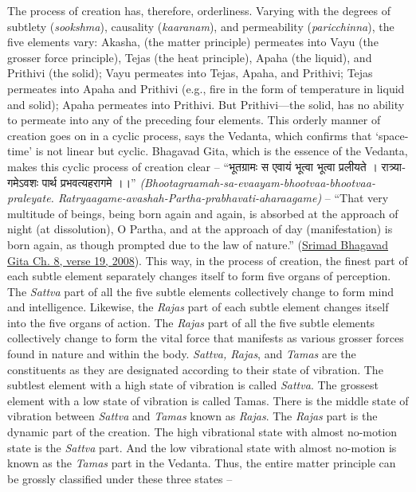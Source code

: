 \documentclass[twoside, 13pt]{article}
\begin{document}
{{The process of creation has, therefore, orderliness. Varying with the degrees of subtlety (\textit{sookshma}), causality (\textit{kaaranam}), and permeability (\textit{paricchinna}), the five elements vary: Akasha, (the matter principle) permeates into Vayu (the grosser force principle), Tejas (the heat principle), Apaha (the liquid), and Prithivi (the solid); Vayu permeates into Tejas, Apaha, and Prithivi; Tejas permeates into Apaha and Prithivi (e.g., fire in the form of temperature in liquid and solid); Apaha permeates into Prithivi. But Prithivi—the solid, has no ability to permeate into any of the preceding four elements. This orderly manner of creation goes on in a cyclic process, says the Vedanta, which confirms that ‘space-time’ is not linear but cyclic. Bhagavad Gita, which is the essence of the Vedanta, makes this cyclic process of creation clear – \foreignlanguage{hindi}{{\fontsize{9}{11}\selectfont “भूतग्रामः स एवायं भूत्वा भूत्वा प्रलीयते । रात्र्यागमेऽवशः पार्थ प्रभवत्यहरागमे ।।”}} \textit{(Bhootagraamah-sa-evaayam-bhootvaa-bhootvaa-praleyate. Ratryaagame-avashah-Partha-prabhavati-aharaagame)} – “That very multitude of beings, being born again and again, is absorbed at the approach of night (at dissolution), O Partha, and at the approach of day (manifestation) is born again, as though prompted due to the law of nature.” (\underline{Srimad Bhagavad Gita Ch. 8, verse 19, 2008}). This way, in the process of creation, the finest part of each subtle element separately changes itself to form five organs of perception. The \textit{Sattva} part of all the five subtle elements collectively change to form mind and intelligence. Likewise, the \textit{Rajas} part of each subtle element changes itself into the five organs of action. The \textit{Rajas} part of all the five subtle elements collectively change to form the vital force that manifests as various grosser forces found in nature and within the body. \textit{Sattva, Rajas}, and \textit{Tamas} are the constituents as they are designated according to their state of vibration. The subtlest element with a high state of vibration is called \textit{Sattva}. The grossest element with a low state of vibration is called Tamas. There is the middle state of vibration between \textit{Sattva} and \textit{Tamas} known as \textit{Rajas}. The \textit{Rajas} part is the dynamic part of the creation. The high vibrational state with almost no-motion state is the \textit{Sattva} part. And the low vibrational state with almost no-motion is known as the \textit{Tamas} part in the Vedanta. Thus, the entire matter principle can be grossly classified under these three states – }}
\end{document}
